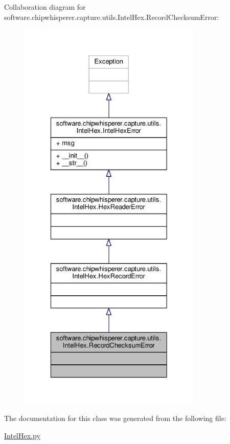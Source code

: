 Collaboration diagram for software.\+chipwhisperer.\+capture.\+utils.\+Intel\+Hex.\+Record\+Checksum\+Error\+:\nopagebreak
\begin{figure}[H]
\begin{center}
\leavevmode
\includegraphics[height=550pt]{d1/d59/classsoftware_1_1chipwhisperer_1_1capture_1_1utils_1_1IntelHex_1_1RecordChecksumError__coll__graph}
\end{center}
\end{figure}


The documentation for this class was generated from the following file\+:\begin{DoxyCompactItemize}
\item 
\hyperlink{IntelHex_8py}{Intel\+Hex.\+py}\end{DoxyCompactItemize}
